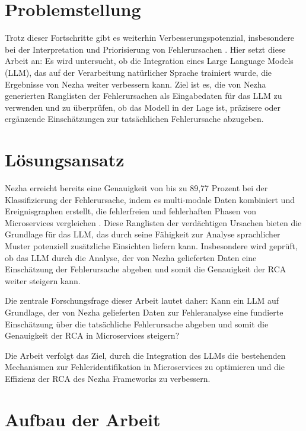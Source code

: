 \section{Problemstellung}
\label{sec:problemstellung}

Trotz dieser Fortschritte gibt es weiterhin Verbesserungspotenzial, insbesondere bei der Interpretation und Priorisierung von Fehlerursachen . Hier setzt diese Arbeit an: Es wird untersucht, ob die Integration eines Large Language Models (LLM), das auf der Verarbeitung natürlicher Sprache trainiert wurde, die Ergebnisse von Nezha weiter verbessern kann. Ziel ist es, die von Nezha generierten Ranglisten der Fehlerursachen als Eingabedaten für das LLM zu verwenden und zu überprüfen, ob das Modell in der Lage ist, präzisere oder ergänzende Einschätzungen zur tatsächlichen Fehlerursache abzugeben.

\section{Lösungsansatz}
\label{sec:loesungsansatz}

Nezha erreicht bereits eine Genauigkeit von bis zu 89,77 Prozent bei der Klassifizierung der Fehlerursache, indem es multi-modale Daten kombiniert und Ereignisgraphen erstellt, die fehlerfreien und fehlerhaften Phasen von Microservices vergleichen \autocite{nezha}. Diese Ranglisten der verdächtigen Ursachen bieten die Grundlage für das LLM, das durch seine Fähigkeit zur Analyse sprachlicher Muster potenziell zusätzliche Einsichten liefern kann. Insbesondere wird geprüft, ob das LLM durch die Analyse, der von Nezha gelieferten Daten eine Einschätzung der Fehlerursache abgeben und somit die Genauigkeit der RCA weiter steigern kann.

Die zentrale Forschungsfrage dieser Arbeit lautet daher: Kann ein LLM auf Grundlage, der von Nezha gelieferten Daten zur Fehleranalyse eine fundierte Einschätzung über die tatsächliche Fehlerursache abgeben und somit die Genauigkeit der RCA in Microservices steigern?

Die Arbeit verfolgt das Ziel, durch die Integration des LLMs die bestehenden Mechanismen zur Fehleridentifikation in Microservices zu optimieren und die Effizienz der RCA des Nezha Frameworks zu verbessern.


\section{Aufbau der Arbeit}




 